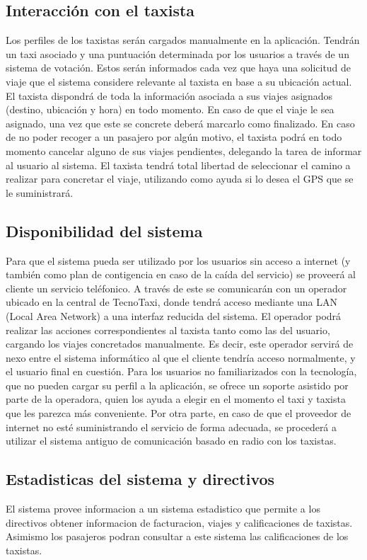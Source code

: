 \subsection{Interacción con el taxista}
Los perfiles de los taxistas serán cargados manualmente en la aplicación. Tendrán un taxi asociado y una puntuación determinada por los usuarios a través de un sistema de votación. Estos serán informados cada vez que haya una solicitud de viaje que el sistema considere relevante al taxista en base a su ubicación actual. El taxista dispondrá de toda la información asociada a sus viajes asignados (destino, ubicación y hora) en todo momento. En caso de que el viaje le sea asignado, una vez que este se concrete deberá marcarlo como finalizado. En caso de no poder recoger a un pasajero por algún motivo, el taxista podrá en todo momento cancelar alguno de sus viajes pendientes, delegando la tarea de informar al usuario al sistema. El taxista tendrá total libertad de seleccionar el camino a realizar para concretar el viaje, utilizando como ayuda si lo desea el GPS que se le suministrará.

\subsection{Disponibilidad del sistema}
Para que el sistema pueda ser utilizado por los usuarios sin acceso a internet (y también como plan de contigencia en caso de la ca\'ida del servicio) se proveerá al cliente un servicio teléfonico. A través de este se comunicarán con un operador ubicado en la central de TecnoTaxi, donde tendrá acceso mediante una LAN (Local Area Network) a una interfaz reducida del sistema. El operador podrá realizar las acciones correspondientes al taxista tanto como las del usuario, cargando los viajes concretados manualmente.  Es decir, este operador servirá de nexo entre el sistema informático al que el cliente tendr\'ia acceso normalmente, y el usuario final en cuestión. Para los usuarios no familiarizados con la tecnolog\'ia, que no pueden cargar su perfil a la aplicaci\'on, se ofrece un soporte asistido por parte de la operadora, quien los ayuda a elegir en el momento el taxi y taxista que les parezca m\'as conveniente.  Por otra parte, en caso de que el proveedor de internet no esté suministrando el servicio de forma adecuada, se procederá a utilizar el sistema antiguo de comunicación basado en radio con los taxistas.

\subsection{Estadisticas del sistema y directivos}
El sistema provee informacion a un sistema estadistico que permite a los directivos obtener informacion de facturacion, viajes y calificaciones de taxistas. Asimismo los pasajeros podran consultar a este sistema las calificaciones de los taxistas.

